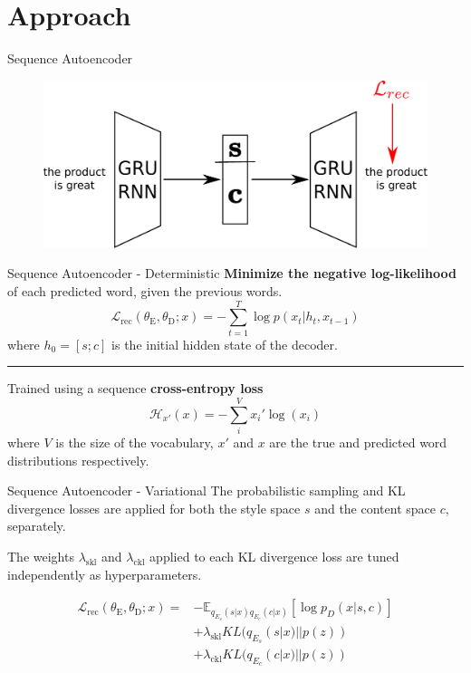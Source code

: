\documentclass[aspectratio=169]{beamer}
\newcommand{\loss}[1]{\mathcal{L}_{\text{#1}}}
\newcommand{\weight}[1]{\lambda_{\text{#1}}}
\newcommand{\param}[1]{\theta_{\text{#1}}}
\begin{document}
% 

\section{Approach}

\begin{frame}{Sequence Autoencoder}
	\centering
	\begin{figure}[ht]
		\includegraphics[width=\textwidth]{images/overview-training-1}
	\end{figure}
\end{frame}

\begin{frame}{Sequence Autoencoder - Deterministic}
	\textbf{Minimize the negative log-likelihood} of each predicted word, given the previous words.
	\begin{equation*} \label{eqn:dae-rec}
		\loss{rec}(\param{E},\param{D}; x) = - \sum_{t=1}^T \log p(x_t | h_t, x_{t-1})
	\end{equation*}
	where $h_0 = [s; c]$ is the initial hidden state of the decoder.

	\noindent\rule{\textwidth}{0.5pt}

	Trained using a sequence \textbf{cross-entropy loss}
	\begin{equation*}
		\mathcal{H}_{x'} (x) = - \sum_{i}^V x_{i}' \log (x_i)
	\end{equation*}
	where $V$ is the size of the vocabulary, $x'$ and $x$ are the true and predicted word distributions respectively.
\end{frame}

\begin{frame}{Sequence Autoencoder - Variational}
	The probabilistic sampling and KL divergence losses are applied for both the style space $s$ and the content space $c$, separately.

	The weights $\weight{skl}$ and $\weight{ckl}$ applied to each KL divergence loss are tuned independently as hyperparameters.

	\begin{align*} \label{eqn:vae-rec}
		\loss{rec}(\param{E},\param{D}; x) =
		 & - \mathbb{E}_{q_{E_s}(s|x) q_{E_c}(c|x)} [\log p_D(x|s,c)] \nonumber \\
		 & + \weight{skl} KL(q_{E_s}(s|x)||p(z))                    \nonumber   \\
		 & + \weight{ckl} KL(q_{E_c}(c|x)||p(z))
	\end{align*}
\end{frame}
\end{document}
